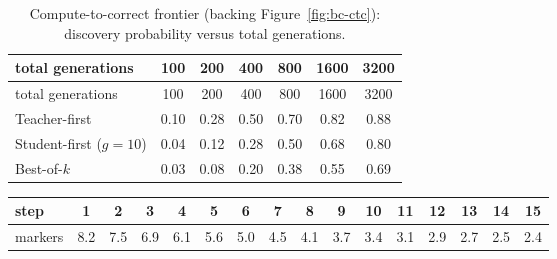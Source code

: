 \documentclass[12pt,a4paper]{report}
\begin{document}
\begin{longtable}{lcccccc}
\caption{Compute-to-correct frontier (backing Figure~\ref{fig:bc-ctc}): discovery probability versus total generations.}\\
\toprule
total generations & 100 & 200 & 400 & 800 & 1600 & 3200 \\
\midrule
\endfirsthead
\toprule
total generations & 100 & 200 & 400 & 800 & 1600 & 3200 \\
\midrule
\endhead
\bottomrule
\endfoot
Teacher-first & 0.10 & 0.28 & 0.50 & 0.70 & 0.82 & 0.88 \\
Student-first ($g{=}10$) & 0.04 & 0.12 & 0.28 & 0.50 & 0.68 & 0.80 \\
Best-of-$k$ & 0.03 & 0.08 & 0.20 & 0.38 & 0.55 & 0.69 \\
\end{longtable}



\begin{center}\footnotesize\setlength{\tabcolsep}{3pt}
\begin{tabular}{lccccccccccccccc}
\toprule
step & 1 & 2 & 3 & 4 & 5 & 6 & 7 & 8 & 9 & 10 & 11 & 12 & 13 & 14 & 15 \\
\midrule
markers & 8.2 & 7.5 & 6.9 & 6.1 & 5.6 & 5.0 & 4.5 & 4.1 & 3.7 & 3.4 & 3.1 & 2.9 & 2.7 & 2.5 & 2.4 \\
\bottomrule
\end{tabular}\par\end{center}
\end{document}
